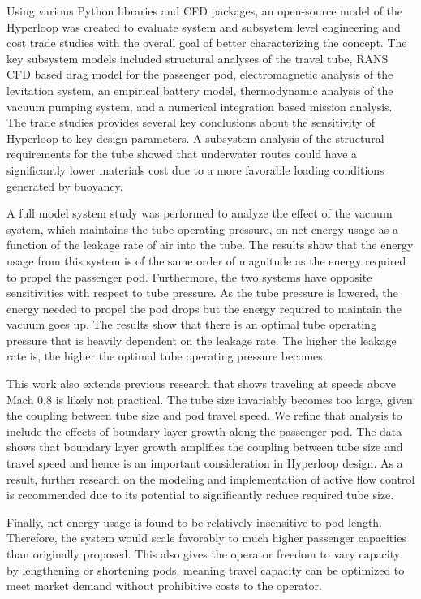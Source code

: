 Using various Python libraries and CFD packages,
an open-source model of the Hyperloop was created to
evaluate system and subsystem level engineering and cost trade studies with
the overall goal of better characterizing the concept. The key subsystem
models included structural analyses of the travel tube, RANS CFD based drag
model for the passenger pod, electromagnetic analysis of the levitation
system, an empirical battery model, thermodynamic analysis of the vacuum
pumping system, and a numerical integration based mission analysis. The trade
studies provides several key conclusions about the sensitivity of Hyperloop to
key design parameters. A subsystem analysis of the structural requirements
for the tube showed that underwater routes could have a significantly lower
materials cost due to a more favorable loading conditions generated by
buoyancy.

A full model system study was performed to analyze the effect of the vacuum
system, which maintains the tube operating pressure, on net energy usage as a
function of the leakage rate of air into the tube. The results show that the
energy usage from this system is of the same order of magnitude as the energy
required to propel the passenger pod. Furthermore, the two systems have
opposite sensitivities with respect to tube pressure. As the tube pressure is
lowered, the energy needed to propel the pod drops but the energy required to
maintain the vacuum goes up. The results show that there is
an optimal tube operating pressure that is heavily dependent on the leakage
rate. The higher the leakage rate is, the higher the optimal tube operating
pressure becomes.

This work also extends previous research that shows traveling at speeds above
Mach 0.8 is likely not practical. The tube size invariably becomes too large,
given the coupling between tube size and pod travel speed.
We refine that analysis to include the effects of boundary layer growth
along the passenger pod. The data shows that boundary layer growth amplifies
the coupling between tube size and travel speed and hence is an important
consideration in Hyperloop design. As a result, further research on the
modeling and implementation of active flow control is recommended due to its
potential to significantly reduce required tube size.

Finally, net energy usage is found to be relatively insensitive to pod length.
Therefore, the system would scale favorably to much higher passenger
capacities than originally proposed.
This also gives the operator freedom to vary capacity by lengthening or
shortening pods, meaning travel capacity can be optimized to meet market demand
without prohibitive costs to the operator.

